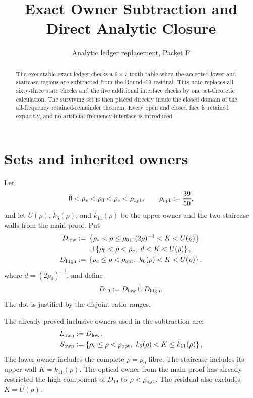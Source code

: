 \documentclass[11pt]{article}
\title{Exact Owner Subtraction and Direct Analytic Closure}
\author{}
\date{Analytic ledger replacement, Packet F}
\begin{document}
\maketitle

\begin{abstract}
The executable exact ledger checks a \(9\times7\) truth table when the
accepted lower and staircase regions are subtracted from the
Round--19 residual. This note replaces all sixty-three state checks and
the five additional interface checks by one set-theoretic calculation.
The surviving set is then placed directly inside the closed domain of the
all-frequency retained-remainder theorem.  Every open and closed face is
retained explicitly, and no artificial frequency interface is introduced.
\end{abstract}

\section{Sets and inherited owners}

Let
\[
 0<\rho_*<\rho_0<\rho_c<\rho_{\rm opt},
 \qquad \rho_{\rm opt}:=\frac{39}{50},
\]
and let \(U(\rho)\), \(k_6(\rho)\), and \(k_{11}(\rho)\) be the upper
owner and the two staircase walls from the main proof. Put
\begin{align}
 D_{\rm low}:={}&
 \left\{\rho_*<\rho\leq\rho_0,
       \ (2\rho)^{-1}<K<U(\rho)\right\}\notag\\
 &\mathbin{\cup}
 \left\{\rho_0<\rho<\rho_c,
       \ d<K<U(\rho)\right\},
 \label{eq:D-low}\\
 D_{\rm high}:={}&
 \left\{\rho_c\leq\rho<\rho_{\rm opt},
       \ k_6(\rho)<K<U(\rho)\right\},
 \label{eq:D-high}
\end{align}
where \(d=(2\rho_0)^{-1}\), and define
\begin{equation}
       D_{19}:=D_{\rm low}\mathbin{\dot\cup}D_{\rm high}.
       \label{eq:D19}
\end{equation}
The dot is justified by the disjoint ratio ranges.

The already-proved inclusive owners used in the subtraction are:
\begin{align}
 L_{\rm own}&:=D_{\rm low},
 \label{eq:lower-owner}\\
 S_{\rm own}&:=
 \left\{\rho_c\leq\rho<\rho_{\rm opt},
          \ k_6(\rho)<K\leq k_{11}(\rho)\right\},
 \label{eq:stair-owner}
\end{align}
The lower owner includes the complete \(\rho=\rho_0\) fibre. The
staircase includes its upper wall \(K=k_{11}(\rho)\). The optical owner
from the main proof has already restricted the high component of
\(D_{19}\) to \(\rho<\rho_{\rm opt}\).  The residual also excludes
\(K=U(\rho)\).
\end{document}
